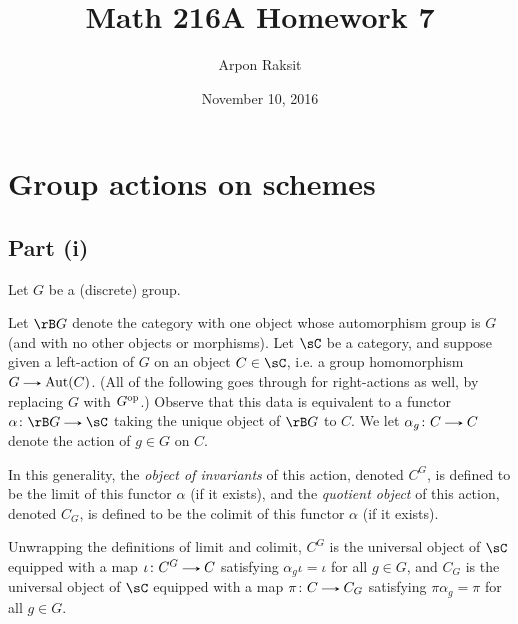 

\title{Math 216A Homework 7}
\author{Arpon Raksit}
\date{November 10, 2016}




\maketitle

\newcommand{\Psh}{\operatorname{Psh}}
\newcommand{\Shv}{\operatorname{Shv}}


\section{Group actions on schemes}

\subsection*{Part (i)}

Let $G$ be a (discrete) group.

\begin{nothing}
  \label{action-as-functor}
  Let $\rB G$ denote the category with one object whose automorphism group is $G$ (and with no other objects or morphisms). Let $\sC$ be a category, and suppose given a left-action of $G$ on an object $C \in \sC$, i.e. a group homomorphism $G \to \Aut(C)$. (All of the following goes through for right-actions as well, by replacing $G$ with $G^{\mathrm{op}}$.) Observe that this data is equivalent to a functor $\alpha \c \rB G \to \sC$ taking the unique object of $\rB G$ to $C$. We let $\alpha_g \c C \to C$ denote the action of $g \in G$ on $C$.

  \begin{subdefinition}
    \label{invariants-as-limit}
    In this generality, the \emph{object of invariants} of this action, denoted $C^G$, is defined to be the limit of this functor $\alpha$ (if it exists), and the \emph{quotient object} of this action, denoted $C_G$, is defined to be the colimit of this functor $\alpha$ (if it exists).

    Unwrapping the definitions of limit and colimit, $C^G$ is the universal object of $\sC$ equipped with a map $\iota \c C^G \to C$ satisfying $\alpha_g\iota = \iota$ for all $g \in G$, and $C_G$ is the universal object of $\sC$ equipped with a map $\pi \c C \to C_G$ satisfying $\pi\alpha_g = \pi$ for all $g \in G$.
  \end{subdefinition}
\end{nothing}

